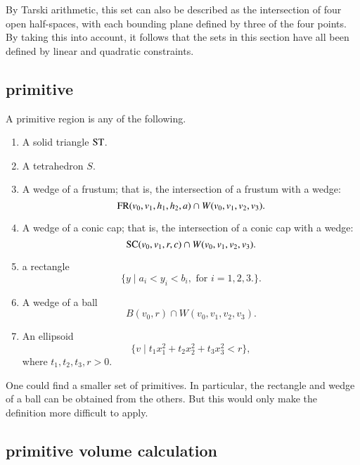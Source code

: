 By Tarski arithmetic, %
this set can also be described
as the intersection of four open half-spaces, with each bounding
plane defined by three of the four points.
By taking this into account, it follows that
the sets in this section have all been defined by linear and quadratic
constraints.

\subsection{primitive}

\begin{definition}[primitive]\label{def:primitive} 
A primitive region is any of the following.

\begin{enumerate}%
 \item A solid triangle ${\operatorname{ST}}$.
 \item A tetrahedron $S$.
 \item A wedge of a frustum;
that is, the intersection of a frustum with
 a wedge:
    $$
     {\operatorname{FR}}(v_0,v_1,h_1,h_2,a) \cap W(v_0,v_1,v_2,v_3).
    $$
\item A wedge of a conic cap; that is, the intersection of a conic cap
with
    a wedge:
    $$
    {\operatorname{SC}}(v_0,v_1,r,c) \cap W(v_0,v_1,v_2,v_3).
    $$
\item a rectangle
    $$
    \{y \mid a_i < y_i < b_i,\text { for } i=1,2,3.\}.
    $$
\item A wedge of a ball
  $$
  B(v_0,r) \cap W(v_0,v_1,v_2,v_3).
  $$
\item An ellipsoid
   $$
   \{v \mid t_1 x_1^2 + t_2 x_2^2 + t_3 x_3^2 < r\},
   $$
where $t_1,t_2,t_3,r>0$.
\end{enumerate}
One could find a smaller set of primitives.  In particular, the
rectangle and wedge of a ball can be obtained from the others.  But
this would only make the definition more difficult to apply.

\end{definition}

\subsection{primitive volume calculation}\label{sec:primitive}

